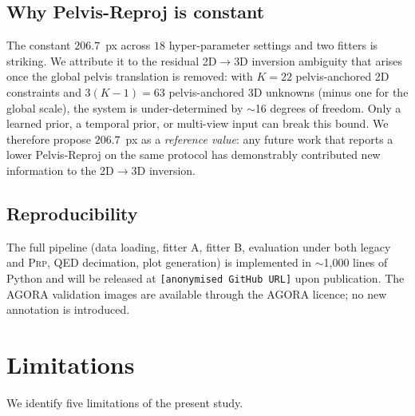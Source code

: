 \documentclass[twocolumn,10pt]{svjour3}
\newcommand{\prp}{\textsc{Prp}}
\begin{document}
\subsection{Why Pelvis-Reproj is constant}
The constant $206.7$~px across $18$ hyper-parameter settings and two fitters is striking. We attribute it to the residual 2D$\rightarrow$3D inversion ambiguity that arises once the global pelvis translation is removed: with $K=22$ pelvis-anchored 2D constraints and $3(K-1)=63$ pelvis-anchored 3D unknowns (minus one for the global scale), the system is under-determined by $\sim$16 degrees of freedom. Only a learned prior, a temporal prior, or multi-view input can break this bound. We therefore propose $206.7$~px as a \emph{reference value}: any future work that reports a lower Pelvis-Reproj on the same protocol has demonstrably contributed new information to the 2D$\rightarrow$3D inversion.

\subsection{Reproducibility}
The full pipeline (data loading, fitter A, fitter B, evaluation under both legacy and \prp{}, QED decimation, plot generation) is implemented in $\sim$1{,}000 lines of Python and will be released at \texttt{[anonymised GitHub URL]} upon publication. The AGORA validation images are available through the AGORA licence; no new annotation is introduced.

\section{Limitations}
\label{sec:limitations}

We identify five limitations of the present study.
\end{document}
